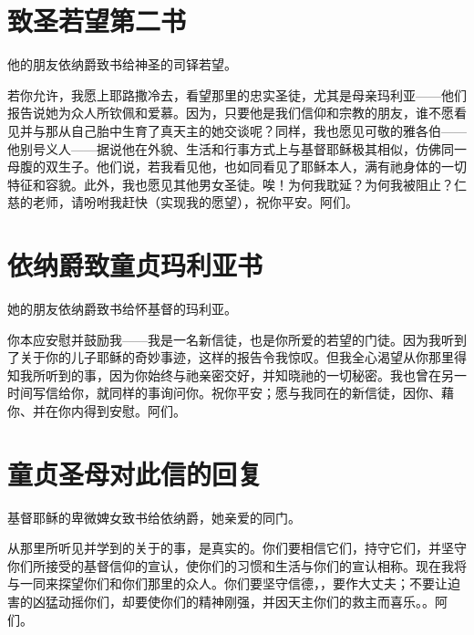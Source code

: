 \section{致圣若望第二书}

他的朋友依纳爵致书给神圣的司铎若望。\par

若你允许，我愿上耶路撒冷去，看望那里的忠实圣徒，尤其是母亲玛利亚——他们报告说她为众人所钦佩和爱慕。因为，只要他是我们信仰和宗教的朋友，谁不愿看见并与那从自己胎中生育了真天主的她交谈呢？同样，我也愿见可敬的雅各伯——他别号义人——据说他在外貌、生活和行事方式上与基督耶稣极其相似，仿佛同一母腹的双生子。他们说，若我看见他，也如同看见了耶稣本人，满有祂身体的一切特征和容貌。此外，我也愿见其他男女圣徒。唉！为何我耽延？为何我被阻止？仁慈的老师，请吩咐我赶快（实现我的愿望），祝你平安。阿们。\par


\section{依纳爵致童贞玛利亚书}

她的朋友依纳爵致书给怀基督的玛利亚。\par

你本应安慰并鼓励我——我是一名新信徒，也是你所爱的若望的门徒。因为我听到了关于你的儿子耶稣的奇妙事迹，这样的报告令我惊叹。但我全心渴望从你那里得知我所听到的事，因为你始终与祂亲密交好，并知晓祂的一切秘密。我也曾在另一时间写信给你，就同样的事询问你。祝你平安；愿与我同在的新信徒，因你、藉你、并在你内得到安慰。阿们。\par


\section{童贞圣母对此信的回复}

基督耶稣的卑微婢女致书给依纳爵，她亲爱的同门。\par

从那里所听见并学到的关于的事，是真实的。你们要相信它们，持守它们，并坚守你们所接受的基督信仰的宣认，使你们的习惯和生活与你们的宣认相称。现在我将与一同来探望你们和你们那里的众人。你们要坚守信德，，要作大丈夫；不要让迫害的凶猛动摇你们，却要使你们的精神刚强，并因天主你们的救主而喜乐。。阿们。\par

